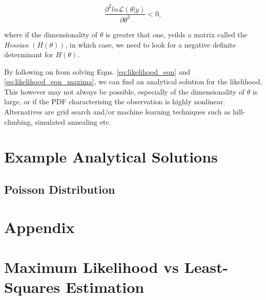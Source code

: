 \documentclass[a4paper,10pt]{article}
\begin{document}
\begin{equation}
 \frac{\partial^2 ln \mathcal{L}(\theta|y)}{\partial \theta ^2} < 0,
\label{eq:likelihood_eqn_maxima}
 \end{equation}
 
where if the dimensionality of $\theta$ is greater that one, yeilds a matrix called the \emph{Hessian} $(H(\theta))$, in which case, we need to look for a negative definite determinant for $H(\theta)$. 

By following on from solving Eqns. \eqref{eq:likelihood_eqn} and \eqref{eq:likelihood_eqn_maxima}, we can find an analytical solution for the likelihood. This however may not always be possible, especially of the dimensionality of  $\theta$ is large, or if the PDF characterising the observation is highly nonlinear. Alternatives are grid search and/or machine learning techniques such as hill-climbing, simulated annealing etc. 

\section{Example Analytical Solutions}
\subsection{Poisson Distribution}




\appendix
\section*{Appendix}
\section{Maximum Likelihood vs Least-Squares Estimation}


%


\end{document}
